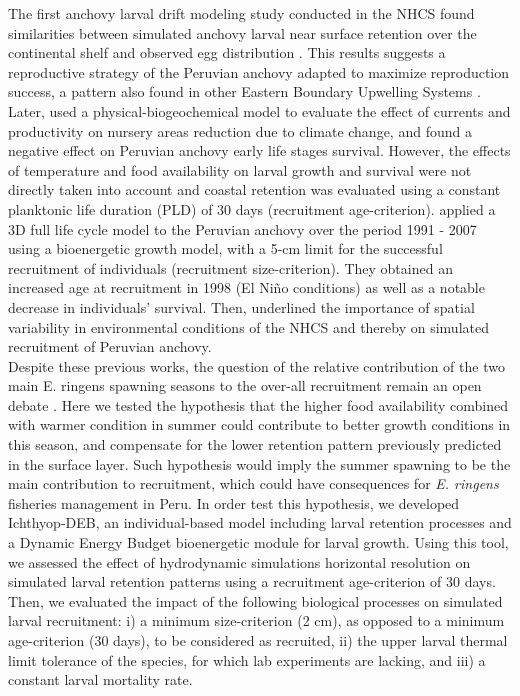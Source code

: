 The first anchovy larval drift modeling study conducted in the NHCS found similarities between simulated anchovy larval near surface retention over the continental shelf and observed egg distribution \citep{BrocLett2008}. This results suggests a reproductive strategy of the Peruvian anchovy adapted to maximize reproduction success, a pattern also found in other Eastern Boundary Upwelling Systems \citep{BrocCola2009}. Later, \cite{BrocEche2013} used a physical-biogeochemical model to evaluate the effect of currents and productivity on nursery areas reduction due to climate change, and found a negative effect on Peruvian anchovy early life stages survival. However, the effects of temperature and food availability on larval growth and survival were not directly taken into account and coastal retention was evaluated using a constant planktonic life duration (PLD) of 30 days (recruitment age-criterion). \cite{XuChai2013} applied a 3D full life cycle model to the Peruvian anchovy over the period 1991 - 2007 using a bioenergetic growth model, with a 5-cm limit for the successful recruitment of individuals (recruitment size-criterion). They obtained an increased age at recruitment in 1998 (El Niño conditions) as well as a notable decrease in individuals’ survival. Then, \cite{XuRose2015} underlined the importance of spatial variability in environmental conditions of the NHCS and thereby on simulated recruitment of Peruvian anchovy.\\

Despite these previous works, the question of the relative contribution of the two main E. ringens spawning seasons to the over-all recruitment remain an open debate \citep{WalsWhit1980,PerePena2011}. Here we tested the hypothesis that the higher food availability combined with warmer condition in summer could contribute to better growth conditions in this season, and compensate for the lower retention pattern previously predicted in the surface layer. Such hypothesis would imply the summer spawning to be the main contribution to recruitment, which could have consequences for \textit{E. ringens} fisheries management in Peru. In order test this hypothesis, we developed Ichthyop-DEB, an individual-based model including larval retention processes \citep{LettVerl2008} and a Dynamic Energy Budget \citep{Kooi2009} bioenergetic module for larval growth. Using this tool, we assessed the effect of hydrodynamic simulations horizontal resolution on simulated larval retention patterns using a recruitment age-criterion of 30 days. Then, we evaluated the impact of the following biological processes on simulated larval recruitment: i) a minimum size-criterion (2 cm), as opposed to a minimum age-criterion (30 days), to be considered as recruited, ii) the upper larval thermal limit tolerance of the species, for which lab experiments are lacking, and iii) a constant larval mortality rate.

